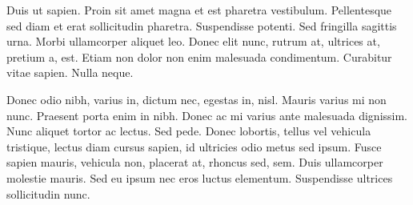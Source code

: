 \documentclass[11pt,letterpaper,onecolumn,twoside,openright,final]{report}
\begin{document}
Duis ut sapien.
Proin sit amet magna et est pharetra vestibulum.
Pellentesque sed diam et erat sollicitudin pharetra.
Suspendisse potenti.
Sed fringilla sagittis urna.
Morbi ullamcorper aliquet leo.
Donec elit nunc, rutrum at, ultrices at, pretium a, est.
Etiam non dolor non enim malesuada condimentum.
Curabitur vitae sapien.
Nulla neque.

Donec odio nibh, varius in, dictum nec, egestas in, nisl.
Mauris varius mi non nunc.
Praesent porta enim in nibh.
Donec ac mi varius ante malesuada dignissim.
Nunc aliquet tortor ac lectus.
Sed pede.
Donec lobortis, tellus vel vehicula tristique, lectus diam cursus sapien, id ultricies odio metus sed ipsum.
Fusce sapien mauris, vehicula non, placerat at, rhoncus sed, sem.
Duis ullamcorper molestie mauris.
Sed eu ipsum nec eros luctus elementum.
Suspendisse ultrices sollicitudin nunc.




\end{document}
